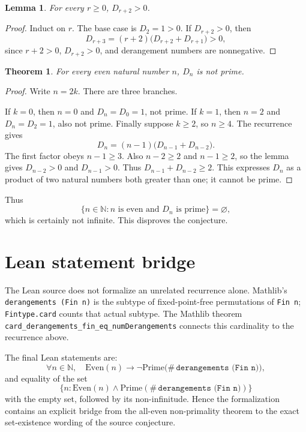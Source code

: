 \documentclass[11pt]{article}
\newtheorem{theorem}{Theorem}
\newtheorem{lemma}{Lemma}
\begin{document}
\begin{lemma}
For every $r\geq0$, $D_{r+2}>0$.
\end{lemma}
\begin{proof}
Induct on $r$.  The base case is $D_2=1>0$.  If $D_{r+2}>0$, then
\[
D_{r+3}=(r+2)\bigl(D_{r+2}+D_{r+1}\bigr)>0,
\]
since $r+2>0$, $D_{r+2}>0$, and derangement numbers are nonnegative.
\end{proof}

\begin{theorem}
For every even natural number $n$, $D_n$ is not prime.
\end{theorem}
\begin{proof}
Write $n=2k$.  There are three branches.

If $k=0$, then $n=0$ and $D_n=D_0=1$, not prime.  If $k=1$, then $n=2$ and
$D_n=D_2=1$, also not prime.  Finally suppose $k\geq2$, so $n\geq4$.
The recurrence gives
\[
 D_n=(n-1)\bigl(D_{n-1}+D_{n-2}\bigr).
\]
The first factor obeys $n-1\geq3$.  Also $n-2\geq2$ and $n-1\geq2$, so the
lemma gives $D_{n-2}>0$ and $D_{n-1}>0$.  Thus
$D_{n-1}+D_{n-2}\geq2$.  This expresses $D_n$ as a product of two natural
numbers both greater than one; it cannot be prime.
\end{proof}

Thus
\[
 \{n\in\mathbb N : n\text{ is even and }D_n\text{ is prime}\}=\varnothing,
\]
which is certainly not infinite.  This disproves the conjecture.

\section*{Lean statement bridge}
The Lean source does not formalize an unrelated recurrence alone.  Mathlib's
\texttt{derangements (Fin n)} is the subtype of fixed-point-free permutations
of \texttt{Fin n}; \texttt{Fintype.card} counts that actual subtype.  The
Mathlib theorem \texttt{card\_derangements\_fin\_eq\_numDerangements} connects
this cardinality to the recurrence above.

The final Lean statements are:
\[
\forall n\in\mathbb N,\quad \mathrm{Even}(n)\to
\neg\mathrm{Prime}\bigl(\#\,\texttt{derangements (Fin n)}\bigr),
\]
and equality of the set
\[
\{n:\mathrm{Even}(n)\land
\mathrm{Prime}(\#\,\texttt{derangements (Fin n)})\}
\]
with the empty set, followed by its non-infinitude.  Hence the formalization
contains an explicit bridge from the all-even non-primality theorem to the
exact set-existence wording of the source conjecture.
\end{document}

